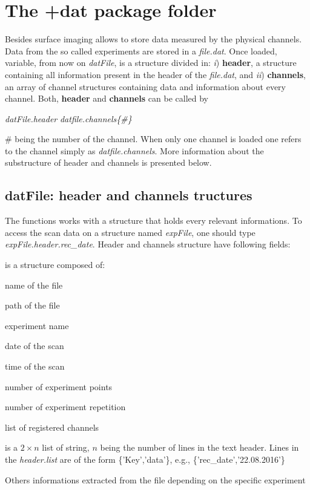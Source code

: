 \section{The +dat package folder}

Besides surface imaging \nanonis{} allows to store data measured by the physical channels. Data from the so called experiments are stored in a \emph{file.dat}.
Once loaded, variable, from now on \emph{datFile}, is a structure divided in: \emph{i}) \textbf{header}, a structure containing all information present in the header of the \emph{file.dat}, and \emph{ii}) \textbf{channels}, an array of channel structures containing data and information about every channel.
Both, \textbf{header} and \textbf{channels} can be called by
\begin{center}
\emph{datFile.header} \quad {} \quad \emph{datfile.channels\{\#\}}
\end{center}
\# being the number of the channel. When only one channel is loaded one refers to the channel simply as \emph{datfile.channels}. 
More information about the substructure of header and channels is presented below.


\subsection{datFile: header and channels tructures}
\label{sec:sxmFile}

The functions works with a structure that holds every relevant informations. To access the scan data on a structure named \emph{expFile}, one should type \emph{expFile.header.rec\_date}. Header and channels structure have following fields:

\bdf
\item[header] is a structure composed of:
  \bdf
  \item[file] name of the file
  \item[path] path of the file
  \item[experiment] experiment name
  \item[rec\_date] date of the scan
  \item[rec\_time] time of the scan
  \item[points] number of experiment points
  \item[grid\_points] number of experiment repetition
  \item[channels] list of registered channels
  \item[list] is a $2 \times n$ list of string, $n$ being the number of lines in the text header. Lines in the \emph{header.list} are of the form \{'Key','data'\}, e.g., \{'rec\_date','22.08.2016'\}
  \item[$\cdots$] Others informations extracted from the file depending on the specific experiment
  \edf

